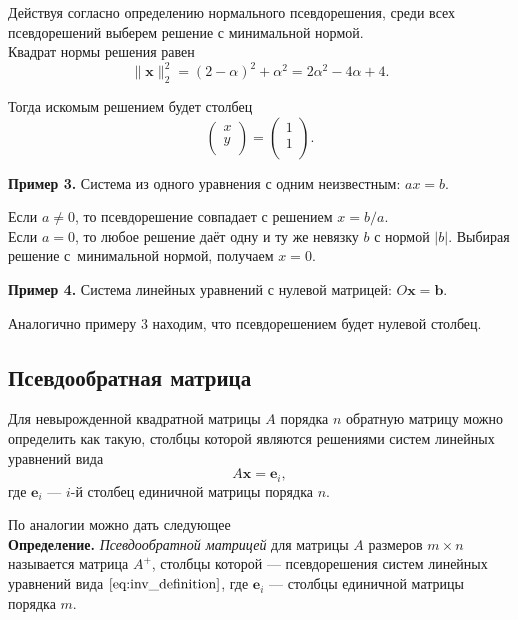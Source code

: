\documentclass[11pt,a4paper]{article}
\begin{document}
Действуя согласно определению нормального псевдорешения, среди всех
псевдорешений выберем решение с минимальной нормой.\\
Квадрат нормы решения равен \[
  \|\mathbf{x}\|_2^2 = (2-\alpha)^2 + \alpha^2 = 2\alpha^2 - 4\alpha + 4.
\]

Тогда искомым решением будет столбец \[
  \begin{pmatrix}
    x \\
    y \\
  \end{pmatrix}
  =
  \begin{pmatrix}
    1 \\
    1 \\
  \end{pmatrix}.
\]

    \textbf{Пример 3.} Система из одного уравнения с одним неизвестным:
\(ax = b\).

Если \(a \ne 0\), то псевдорешение совпадает с решением \(x = b/a\).\\
Если \(a = 0\), то любое решение даёт одну и ту же невязку \(b\) с
нормой \(|b|\). Выбирая решение с~минимальной нормой, получаем
\(x = 0\).

    \textbf{Пример 4.} Система линейных уравнений с нулевой матрицей:
\(O \mathbf{x} = \mathbf{b}\).

Аналогично примеру 3 находим, что псевдорешением будет нулевой столбец.

    \hypertarget{ux43fux441ux435ux432ux434ux43eux43eux431ux440ux430ux442ux43dux430ux44f-ux43cux430ux442ux440ux438ux446ux430}{%
\subsection{Псевдообратная
матрица}\label{ux43fux441ux435ux432ux434ux43eux43eux431ux440ux430ux442ux43dux430ux44f-ux43cux430ux442ux440ux438ux446ux430}}

Для невырожденной квадратной матрицы \(A\) порядка \(n\) обратную
матрицу можно определить как такую, столбцы которой являются решениями
систем линейных уравнений вида \[
  A\mathbf{x} = \mathbf{e}_i, \tag{3} \label{eq:inv_definition}
\] где \(\mathbf{e}_i\) --- \(i\)-й столбец единичной матрицы порядка
\(n\).

По аналогии можно дать следующее\\
\textbf{Определение.} \emph{Псевдообратной матрицей} для матрицы \(A\)
размеров \(m \times n\) называется матрица \(A^+\), столбцы которой ---
псевдорешения систем линейных уравнений вида
\(\eqref{eq:inv_definition}\), где \(\mathbf{e}_i\) --- столбцы
единичной матрицы порядка \(m\).
\end{document}
